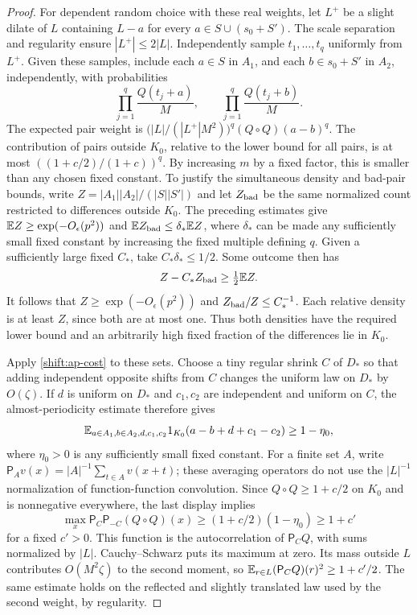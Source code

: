 \begin{proof}
For dependent random choice with these real weights, let $L^+$ be a
slight dilate of $L$ containing $L-a$ for every
$a\in S\cup(s_0+S')$.  The scale separation and regularity ensure
$|L^+|\leq2|L|$.  Independently sample $t_1,\ldots,t_q$
uniformly from $L^+$.  Given these samples, include each
$a\in S$ in $A_1$, and each $b\in s_0+S'$ in $A_2$,
independently, with probabilities
\[
 \prod_{j=1}^q\frac{Q(t_j+a)}{M},\qquad
 \prod_{j=1}^q\frac{Q(t_j+b)}{M}.
\]
The expected pair weight is
$\bigl(|L|/(|L^+|M^2)\bigr)^q(Q\circ Q)(a-b)^q$.
The contribution of pairs outside $K_0$, relative to the lower
bound for all pairs, is at most
$((1+c/2)/(1+c))^q$.  By increasing $m$ by a fixed factor,
this is smaller than any chosen fixed constant.
To justify the simultaneous density and bad-pair bounds, write
$Z=|A_1||A_2|/(|S||S'|)$ and let $Z_{\rm bad}$ be the same
normalized count restricted to differences outside $K_0$.
The preceding estimates give $\mathbb E Z\ge\exp(-O_\epsilon(p^2))$
and $\mathbb E Z_{\rm bad}\le\delta_*\mathbb E Z$, where $\delta_*$ can
be made any sufficiently small fixed constant by increasing the
fixed multiple defining $q$.  Given a sufficiently large fixed
$C_*$, take $C_*\delta_*\le1/2$.  Some outcome then has
\[
 Z-C_*Z_{\rm bad}\ge\tfrac12\mathbb E Z.
\]
It follows that $Z\ge\exp(-O_\epsilon(p^2))$ and
$Z_{\rm bad}/Z\le C_*^{-1}$.  Each relative density is at least
$Z$, since both are at most one.  Thus both densities have the
required lower bound and an arbitrarily high fixed fraction of
the differences lie in $K_0$.

Apply \eqref{shift:ap-cost} to these sets.  Choose a tiny regular
shrink $C$ of $D_*$ so that adding independent opposite shifts
from $C$ changes the uniform law on $D_*$ by $O(\zeta)$.
If $d$ is uniform on $D_*$ and $c_1,c_2$ are independent and
uniform on $C$, the almost-periodicity estimate therefore gives
\[
 \mathbb E_{a\in A_1,b\in A_2,d,c_1,c_2}
 1_{K_0}(a-b+d+c_1-c_2)\geq1-\eta_0,
\]
where $\eta_0>0$ is any sufficiently small fixed constant.
For a finite set $A$, write
$\mathsf P_Av(x)=|A|^{-1}\sum_{t\in A}v(x+t)$; these averaging
operators do not use the $|L|^{-1}$ normalization of function-function
convolution.  Since $Q\circ Q\geq1+c/2$ on $K_0$ and is
nonnegative everywhere, the last display implies
\[
 \max_x\mathsf P_C\mathsf P_{-C}(Q\circ Q)(x)
 \geq(1+c/2)(1-\eta_0)\geq1+c'
\]
for a fixed $c'>0$.
This function is the autocorrelation of $\mathsf P_CQ$, with sums
normalized by $|L|$.  Cauchy--Schwarz puts its maximum at zero.
Its mass outside $L$ contributes $O(M^2\zeta)$ to the second
moment, so
$\mathbb E_{r\in L}(\mathsf P_CQ)(r)^2\geq1+c'/2$.
The same estimate holds on the reflected and slightly translated
law used by the second weight, by regularity.


\end{proof}

